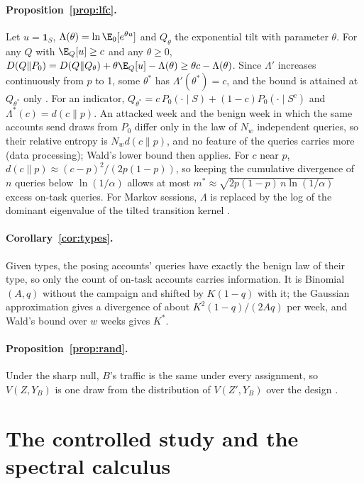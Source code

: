 \paragraph{Proposition~\ref{prop:lfc}.} Let $u=\mathbf 1_S$, $\Lambda(\theta)=\ln\E_0[e^{\theta u}]$ and $Q_\theta$ the exponential tilt with parameter $\theta$. For any $Q$ with $\E_Q[u]\ge c$ and any $\theta\ge0$, $D(Q\|P_0)=D(Q\|Q_\theta)+\theta\E_Q[u]-\Lambda(\theta)\ge\theta c-\Lambda(\theta)$. Since $\Lambda'$ increases continuously from $p$ to 1, some $\theta^*$ has $\Lambda'(\theta^*)=c$, and the bound is attained at $Q_{\theta^*}$ only \citep{csiszar1975idivergence}. For an indicator, $Q_{\theta^*}=c\,P_0(\cdot\mid S)+(1-c)P_0(\cdot\mid S^c)$ and $\Lambda^*(c)=d(c\|p)$. An attacked week and the benign week in which the same accounts send draws from $P_0$ differ only in the law of $N_w$ independent queries, so their relative entropy is $N_w d(c\|p)$, and no feature of the queries carries more (data processing); Wald's lower bound then applies. For $c$ near $p$, $d(c\|p)\approx(c-p)^2/(2p(1-p))$, so keeping the cumulative divergence of $n$ queries below $\ln(1/\alpha)$ allows at most $m^*\approx\sqrt{2p(1-p)\,n\ln(1/\alpha)}$ excess on-task queries. For Markov sessions, $\Lambda$ is replaced by the log of the dominant eigenvalue of the tilted transition kernel \citep{chetrite2015nonequilibrium}.

\paragraph{Corollary~\ref{cor:types}.} Given types, the posing accounts' queries have exactly the benign law of their type, so only the count of on-task accounts carries information. It is Binomial$(A,q)$ without the campaign and shifted by $K(1-q)$ with it; the Gaussian approximation gives a divergence of about $K^2(1-q)/(2Aq)$ per week, and Wald's bound over $w$ weeks gives $K^*$.

\paragraph{Proposition~\ref{prop:rand}.} Under the sharp null, $B$'s traffic is the same under every assignment, so $V(Z,Y_B)$ is one draw from the distribution of $V(Z',Y_B)$ over the design \citep{fisher1935design,imbens2015causal}.





\section{The controlled study and the spectral calculus}
\label{app:controlled}


